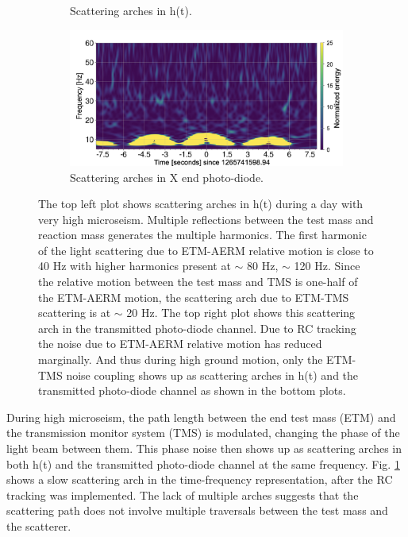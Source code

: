 \documentclass[12pt]{iopart}
\begin{document}
\begin{figure}[h]
\begin{subfigure}[b]{0.45\textwidth}
         \caption{Scattering arches in h(t).}
         \label{fig:1265darm}
    \end{subfigure}
    \begin{subfigure}[b]{0.45\textwidth}
        \centering
         \includegraphics[width =\textwidth]{post_r0_transomeg2.png}
         \caption{Scattering arches in X end photo-diode.}
         \label{fig:1265trans}
     \end{subfigure}
     
     
    \caption{The top left plot shows scattering arches in h(t) during a day with very high microseism. Multiple reflections between the test mass and reaction mass generates the multiple harmonics. The first harmonic of the light scattering due to ETM-AERM relative motion is close to 40 Hz with higher harmonics present at $\sim$ 80 Hz, $\sim$ 120 Hz. Since the relative motion between the test mass and TMS is one-half of the ETM-AERM motion, the scattering arch due to ETM-TMS scattering is at $\sim$ 20 Hz. The top right plot shows this scattering arch in the transmitted photo-diode channel. Due to RC tracking the noise due to ETM-AERM relative motion has reduced marginally. And thus during high ground motion, only the ETM-TMS noise coupling shows up as scattering arches in h(t) and the transmitted photo-diode channel as shown in the bottom plots.}
    \label{fig:1262scat}
    
\end{figure}
During high microseism, the path length between the end test mass (ETM) and the transmission monitor system (TMS) is modulated, changing the phase of the light beam between them. This phase noise then shows up as scattering arches in both h(t) and the transmitted photo-diode channel at the same frequency. Fig. \ref{fig:1265darm} shows a  slow scattering arch in the time-frequency representation, after the RC tracking was implemented. The lack of multiple arches suggests that the scattering  path does not involve multiple traversals between the test mass and the scatterer.
\end{document}
